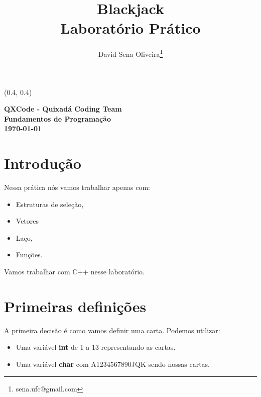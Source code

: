\documentclass[12pt]{article}
\newcommand{\bold}[1]{\textbf{#1}} %
\begin{document}
\begin{textblock}{15}(0.4, 0.4)
	\noindent
	\begin{center}
		\LARGE{\bf{QXCode - Quixadá Coding Team}}\\
		\large{\bf{Fundamentos de Programação}} \\
		\large{\bf{\today}}
	\end{center}
\end{textblock}

\title{\bf{Blackjack \\ Laboratório Prático}}

\author{
	David Sena Oliveira\thanks{sena.ufc@gmail.com}
}

\date{}

\maketitle
\thispagestyle{empty}

\section{Introdução}

Nessa prática nós vamos trabalhar apenas com:
\begin{itemize}
	\item Estruturas de seleção,
	\item Vetores
	\item Laço,
	\item Funções.
\end{itemize}

Vamos trabalhar com C++ nesse laboratório.

\section{Primeiras definições}

A primeira decisão é como vamos definir uma carta. Podemos utilizar:

\begin{itemize}
	\item Uma variável \bold{int} de 1 a 13 representando as cartas.
	\item Uma variável \bold{char} com A1234567890JQK sendo nossas cartas.
\end{itemize}
\end{document}
